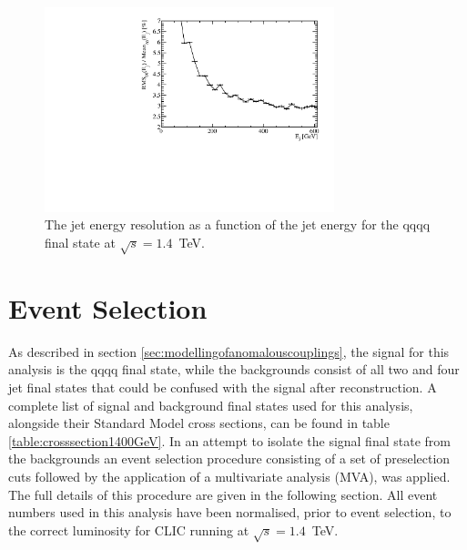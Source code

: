 \begin{figure}
\centering
\includegraphics[width=0.75\textwidth]{PhysicsAnalysis/Plots/JetEnergyResolution/JetEnergyResolutionScan_1400GeV.pdf}
\caption[The jet energy resolution as a function of the jet energy for the {\nu}{\nu}qqqq final state at $\sqrt{s}=1.4$~TeV.]{The jet energy resolution as a function of the jet energy for the {\nu}{\nu}qqqq final state at $\sqrt{s}=1.4$~TeV.}
\label{fig:jeteenrgyresolutionphysicsanalysis}
\end{figure}


\section{Event Selection}
\label{sec:eventselection}
As described in section \ref{sec:modellingofanomalouscouplings}, the signal for this analysis is the \nu{\nu}qqqq final state, while the backgrounds consist of all two and four jet final states that could be confused with the signal after reconstruction.  A complete list of signal and background final states used for this analysis, alongside their Standard Model cross sections, can be found in table \ref{table:crosssection1400GeV}.  In an attempt to isolate the signal final state from the backgrounds an event selection procedure consisting of a set of preselection cuts followed by the application of a multivariate analysis (MVA), was applied.  The full details of this procedure are given in the following section.  All event numbers used in this analysis have been normalised, prior to event selection, to the correct luminosity for CLIC running at $\sqrt{s}=1.4$~TeV.

